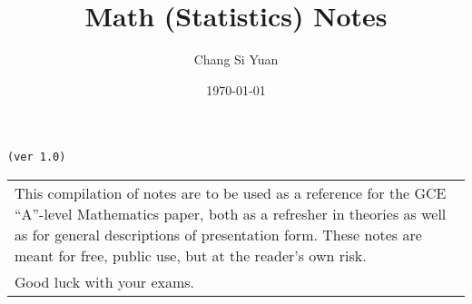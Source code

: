 \documentclass[../main]{subfiles}
\begin{document}
\author{Chang Si Yuan}
\title{Math (Statistics) Notes}
\date{\today}

\maketitle

\begin{center}

	\texttt{(ver 1.0)}

	\vspace{50pt}

	\begin{tabular}{>{\flushleft}p{8cm}}
	This compilation of notes are to be used as a reference for the GCE ``A''-level Mathematics paper, both as a refresher in theories as well as for general descriptions of presentation form. These notes are meant for free, public use, but at the reader's own risk. \\
	Good luck with your exams.
	\end{tabular}

	\vspace{50pt}

\end{center}

\newpage
\end{document}
